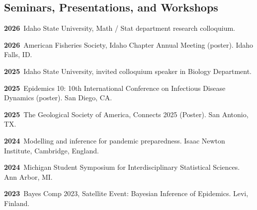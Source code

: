 \documentclass[11pt]{article}
\newenvironment {reflist}
                {
                 \begin{list}{}
                 {\setlength{\labelwidth}{0mm}
                  \setlength{\leftmargin}{8mm}
                  \setlength{\itemindent}{-3mm}
                  \setlength{\labelsep}{0mm}
                  \setlength{\parsep}{0.1 ex}
                  \setlength{\itemsep}{0.1cm}
      \setlength{\topsep}{0.15cm}}} %
   {\end{list}}
\begin{document}
\subsection*{Seminars, Presentations, and Workshops}

\begin{reflist}

    \item \textbf{2026}\, Idaho State University, Math / Stat department research colloquium.

    \item \textbf{2026}\, American Fisheries Society, Idaho Chapter Annual Meeting (poster). Idaho Falls, ID.

    \item \textbf{2025}\, Idaho State University, invited colloquium speaker in Biology Department.

    \item \textbf{2025}\, Epidemics 10: 10th International Conference on Infectious Disease Dynamics (poster). San Diego, CA.

    \item \textbf{2025}\, The Geological Society of America, Connects 2025 (Poster). San Antonio, TX.

    \item \textbf{2024}\, Modelling and inference for pandemic preparedness. Isaac Newton Institute, Cambridge, England.

    \item \textbf{2024}\, Michigan Student Symposium for Interdisciplinary Statistical Sciences. Ann Arbor, MI.

    \item \textbf{2023}\, Bayes Comp 2023, Satellite Event: Bayesian Inference of Epidemics. Levi, Finland.


\end{reflist}
\end{document}
